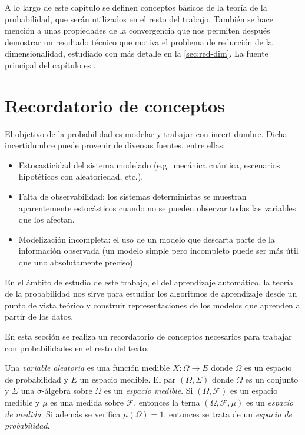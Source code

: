 A lo largo de este capítulo se definen conceptos básicos de la teoría de la probabilidad, que serán utilizados en el resto del trabajo. También se hace mención a unas propiedades de la convergencia que nos permiten después demostrar un resultado técnico que motiva el problema de reducción de la dimensionalidad, estudiado con más detalle en la \autoref{sec:red-dim}.  La fuente principal del capítulo es \textcite[capítulo 3]{goodfellow2016}.

\section{Recordatorio de conceptos}\label{conceptos}

El objetivo de la probabilidad es modelar y trabajar con incertidumbre.
Dicha incertidumbre puede provenir de diversas fuentes, entre ellas:

\begin{itemize}
\tightlist
\item
  Estocasticidad del sistema modelado (e.g.~mecánica cuántica,
  escenarios hipotéticos con aleatoriedad, etc.).
\item
  Falta de observabilidad: los sistemas deterministas se muestran
  aparentemente estocásticos cuando no se pueden observar todas las
  variables que los afectan.
\item
  Modelización incompleta: el uso de un modelo que descarta parte de la
  información observada (un modelo simple pero incompleto puede ser más
  útil que uno absolutamente preciso).
\end{itemize}

En el ámbito de estudio de este trabajo, el del aprendizaje automático, la
teoría de la probabilidad nos sirve para estudiar los algoritmos de
aprendizaje desde un punto de vista teórico y construir representaciones de los
modelos que aprenden a partir de los datos.

En esta sección se realiza un recordatorio de conceptos necesarios para
trabajar con probabilidades en el resto del texto.

Una \emph{variable aleatoria} es una función medible
\(X:\Omega\rightarrow E\) donde \(\Omega\) es un espacio de probabilidad
y \(E\) un espacio medible. 
{}
El par \((\Omega, \Sigma)\) donde \(\Omega\) es un conjunto y \(\Sigma\)
una \(\sigma\)-álgebra sobre \(\Omega\) es un \emph{espacio medible}.
{}
Si \((\Omega, \mathcal{F})\) es un espacio medible y \(\mu\) es una
medida sobre \(\mathcal{F}\), entonces la terna
\((\Omega, \mathcal{F}, \mu)\) es un \emph{espacio de medida}. Si
además se verifica \(\mu(\Omega)=1\), entonces se trata de un
\emph{espacio de probabilidad}. 

